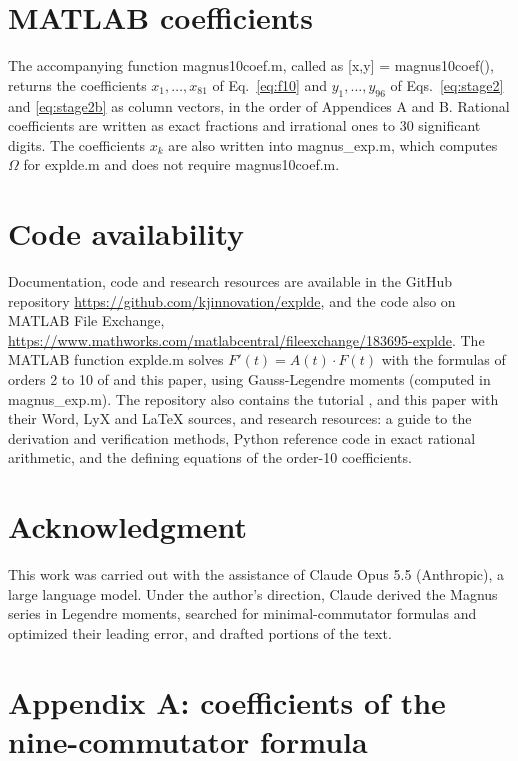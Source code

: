 \documentclass[12pt]{article}
\begin{document}
\section*{MATLAB coefficients}

The accompanying function magnus10coef.m, called as [x,y] = magnus10coef(), returns the coefficients $x_1,\ldots,x_{81}$ of Eq.~\ref{eq:f10} and $y_1,\ldots,y_{96}$ of Eqs.~\ref{eq:stage2} and \ref{eq:stage2b} as column vectors, in the order of Appendices A and B. Rational coefficients are written as exact fractions and irrational ones to 30 significant digits. The coefficients $x_k$ are also written into magnus\_exp.m, which computes $\Omega$ for explde.m and does not require magnus10coef.m.

\section*{Code availability}

Documentation, code and research resources are available in the GitHub repository \url{https://github.com/kjinnovation/explde}, and the code also on MATLAB File Exchange, \url{https://www.mathworks.com/matlabcentral/fileexchange/183695-explde}. The MATLAB function explde.m solves $F'(t)=A(t)\cdot F(t)$ with the formulas of orders 2 to 10 of \cite{j28} and this paper, using Gauss-Legendre moments (computed in magnus\_exp.m). The repository also contains the tutorial \cite{jtut}, \cite{j28} and this paper with their Word, LyX and LaTeX sources, and research resources: a guide to the derivation and verification methods, Python reference code in exact rational arithmetic, and the defining equations of the order-10 coefficients.

\section*{Acknowledgment}

This work was carried out with the assistance of Claude Opus 5.5 (Anthropic), a large language model. Under the author's direction, Claude derived the Magnus series in Legendre moments, searched for minimal-commutator formulas and optimized their leading error, and drafted portions of the text.

\section*{Appendix A: coefficients of the nine-commutator formula}
\end{document}
